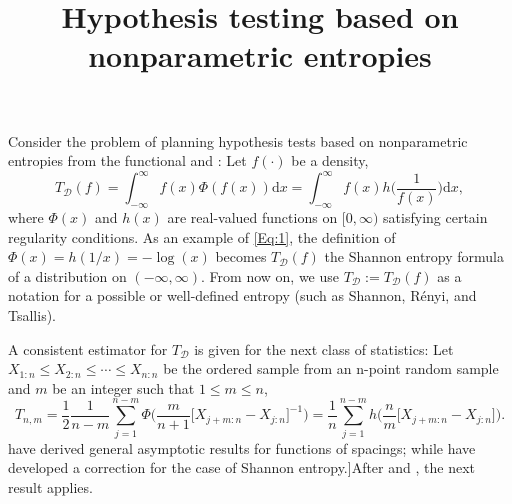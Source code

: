 \documentclass[12pt]{article}
\title{Hypothesis testing based on nonparametric entropies}
\begin{document}
\maketitle
	

Consider the problem of planning hypothesis tests based on nonparametric entropies from the functional \citep{Khashimov1990} and \citep{Bert1992}:
Let $f(\cdot)$ be a density,
\begin{equation}
T_{\mathcal{D}}(f)=\int_{-\infty}^\infty f(x)\Phi(f(x))\mathrm{d}x=\int_{-\infty}^\infty f(x)h\Big(\frac 1{f(x)}\Big)\mathrm{d}x,
\label{Eq:1}
\end{equation}
where $\Phi(x)$ and $h(x)$ are real-valued functions on $[0,\infty)$ satisfying certain regularity conditions.
As an example of \eqref{Eq:1}, the definition of $\Phi(x)=h(1/x)=-\log(x)$ becomes $T_{\mathcal{D}}(f)$ the Shannon entropy formula of a distribution on $(-\infty, \infty)$.
From now on, we use $T_{\mathcal{D}}:=T_{\mathcal{D}}(f)$ as a notation for a possible or well-defined entropy (such as Shannon, R\'enyi, and Tsallis).

A consistent estimator for $T_{\mathcal{D}}$ is given for the next class of statistics:
Let $X_{1:n}\leq X_{2:n}\leq\cdots\leq X_{n:n}$ be the ordered sample from an n-point random sample and $m$ be an integer such that $1\leq m\leq n$,
$$
T_{n,m}
=
{\frac 12}\frac{1}{n-m}\sum_{j=1}^{n-m}\Phi\Big(\frac{m}{n+1}\Big[X_{j+m:n}-X_{j:n}\Big]^{-1}\Big)
=
\frac{1}{n}\sum_{j=1}^{n-m}h\Big(\frac{n}{m}\Big[X_{j+m:n}-X_{j:n}\Big]\Big).
$$
\citet{Khashimov1990} have derived general asymptotic results for functions of spacings; while \citet{Bert1992} have developed a correction for the case of Shannon entropy.]After \citet{Khashimov1990} and \citet{Bert1992}, the next result applies.
\end{document}
